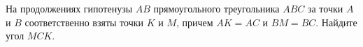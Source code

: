 \begin{ex}
	\begin{condition}
		На продолжениях гипотенузы \( AB  \) прямоугольного	треугольника \( ABC  \) за точки \( A  \) и \( B  \) соответственно взяты точки \( K  \) и \( M  \), причем \( AK = AC  \) и \( BM = BC \). Найдите угол \( MCK \).
	\end{condition}
\end{ex}